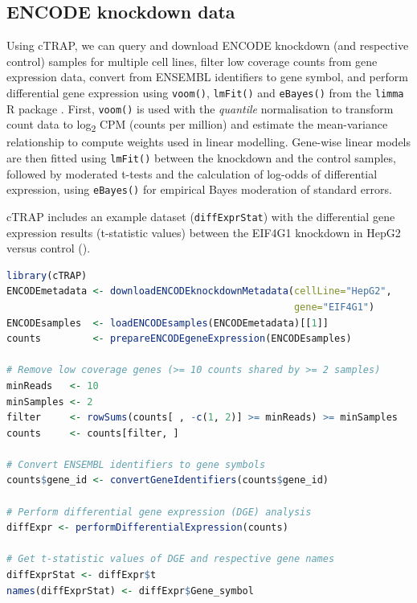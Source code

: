 \subsection{ENCODE knockdown data}

Using cTRAP, we can query and download ENCODE knockdown (and respective control) samples for multiple cell lines, filter low coverage counts from gene expression data, convert from ENSEMBL identifiers to gene symbol, and perform differential gene expression using \texttt{voom()}, \texttt{lmFit()} and \texttt{eBayes()} from the \texttt{limma} R package \cite{ritchie:2015tm}. First, \texttt{voom()} is used with the \emph{quantile} normalisation to transform count data to log\textsubscript{2} CPM (counts per million) and estimate the mean-variance relationship to compute weights used in linear modelling. Gene-wise linear models are then fitted using \texttt{lmFit()} between the knockdown and the control samples, followed by moderated t-tests and the calculation of log-odds of differential expression, using \texttt{eBayes()} for empirical Bayes moderation of standard errors.

cTRAP includes an example dataset (\texttt{diffExprStat}) with the differential gene expression results (t-statistic values) between the EIF4G1 knockdown in HepG2 versus control ().

\begin{lstlisting}[caption=Code to obtain example dataset \texttt{diffExprStat}.,language=R,label={lst:diffExprStat}]
library(cTRAP)
ENCODEmetadata <- downloadENCODEknockdownMetadata(cellLine="HepG2",
                                                  gene="EIF4G1")
ENCODEsamples  <- loadENCODEsamples(ENCODEmetadata)[[1]]
counts         <- prepareENCODEgeneExpression(ENCODEsamples)

# Remove low coverage genes (>= 10 counts shared by >= 2 samples)
minReads   <- 10
minSamples <- 2
filter     <- rowSums(counts[ , -c(1, 2)] >= minReads) >= minSamples
counts     <- counts[filter, ]

# Convert ENSEMBL identifiers to gene symbols
counts$gene_id <- convertGeneIdentifiers(counts$gene_id)

# Perform differential gene expression (DGE) analysis
diffExpr <- performDifferentialExpression(counts)

# Get t-statistic values of DGE and respective gene names
diffExprStat <- diffExpr$t
names(diffExprStat) <- diffExpr$Gene_symbol
\end{lstlisting}

